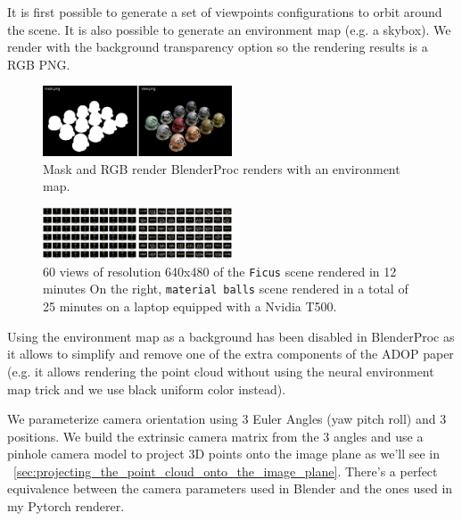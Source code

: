 It is first possible to generate a set of viewpoints configurations to orbit around the scene. It is also possible to generate an environment map (e.g. a skybox). We render with the background transparency option so the rendering results is a RGB PNG. 

\begin{figure}[H]
    \centering
    \includegraphics[width=0.5\textwidth]{figures/blenderproc_renders.png}
    \caption{Mask and RGB render BlenderProc renders with an environment map.}
    \label{fig:blenderproc_renders}
\end{figure}

\begin{figure}[H]
    \centering
    \includegraphics[width=0.5\textwidth]{figures/ficus_and_matballs.png}
    \caption{60 views of resolution 640x480 of the \texttt{Ficus} scene rendered in 12 minutes On the right, \texttt{material balls} scene rendered in a total of 25 minutes on a laptop equipped with a Nvidia T500.}
    \label{fig:multiview}
\end{figure}

Using the environment map as a background has been disabled in BlenderProc as it allows to simplify and remove one of the extra components of the ADOP paper (e.g. it allows rendering the point cloud without using the neural environment map trick and we use black uniform color instead).

We parameterize camera orientation using 3 Euler Angles (yaw pitch roll) and 3 positions. We build the extrinsic camera matrix from the 3 angles and use a pinhole camera model to project 3D points onto the image plane as we'll see in ~\cref{sec:projecting_the_point_cloud_onto_the_image_plane}. There's a perfect equivalence between the camera parameters used in Blender and the ones used in my Pytorch renderer.

